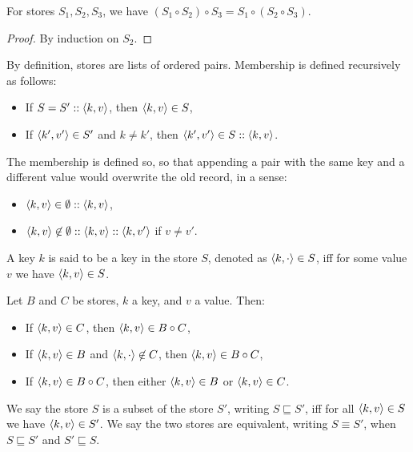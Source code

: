 \begin{lemma}[Associativity]
For stores $S_1, S_2, S_3$, we have $(S_1 \circ S_2) \circ S_3 = S_1 \circ (S_2 \circ S_3)$.
\end{lemma}
\begin{proof}
By induction on $S_2$.
\end{proof}

\begin{definition}[Membership]
\label{defn:generic-context-membership}
By definition, stores are lists of ordered pairs. Membership is defined recursively as follows:
\begin{itemize}
    \item If $S = S' :: \langle k, v \rangle$, then $\langle k, v \rangle \in S$,
    \item If $\langle k', v' \rangle \in S'$ and $k \not= k'$, then $\langle k', v' \rangle \in S :: \langle k, v \rangle$. \qedhere
\end{itemize}
\end{definition}

The membership is defined so, so that appending a pair with the same key and a different value would overwrite the old record, in a sense:
\begin{itemize}
    \item $\langle k, v \rangle \in \emptyset :: \langle k, v \rangle$,
    \item $\langle k, v \rangle \not\in \emptyset :: \langle k, v \rangle :: \left\langle k, v' \right\rangle$ if $v \ne v'$.
\end{itemize}

\begin{definition}
A key $k$ is said to be a key in the store $S$, denoted as $\left\langle k, \cdot \right\rangle \in S$, iff for some value $v$ we have $\langle k, v \rangle \in S$.
\end{definition}

\begin{lemma}
Let $B$ and $C$ be stores, $k$ a key, and $v$ a value. Then:
\begin{itemize}
    \item If $\langle k, v \rangle \in C$, then $\langle k, v \rangle \in B \circ C$,
    \item If $\langle k, v \rangle \in B$ and $\left\langle k, \cdot \right\rangle \not\in C$, then $\langle k, v \rangle \in B \circ C$,
    \item If $\langle k, v \rangle \in B \circ C$, then either $\langle k, v \rangle \in B$ or $\langle k, v \rangle \in C$.
\end{itemize}
\end{lemma}

\begin{definition}[Equivalence]
We say the store $S$ is a subset of the store $S'$, writing $S \sqsubseteq S'$, iff for all $\langle k, v \rangle \in S$ we have $\langle k, v \rangle \in S'$. We say the two stores are equivalent, writing $S \equiv S'$, when $S \sqsubseteq S'$ and $S' \sqsubseteq S$.
\end{definition}


